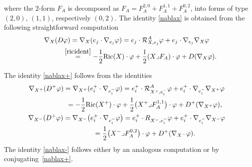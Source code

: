 \documentclass[pdftex]{sigma}
\numberwithin{equation}{section}
\theoremstyle{definition}
\begin{document}
where the $2$-form $F_A$ is decomposed as $F_A=F_A^{2,0}+F_A^{1,1}+F_A^{0,2}$, into forms of type $(2,0)$, $(1,1)$, respectively $(0,2)$.
The identity \eqref{nablax} is obtained from the following straightforward computation
\begin{gather*}
\nabla_X(D\varphi) =\nabla_X( e_j\cdot \nabla_{e_j}\varphi)= e_j\cdot \mathcal{R}^A_{X,e_j}\varphi+ e_j\cdot \nabla_{e_j}\nabla_X\varphi\\
 \hphantom{\nabla_X(D\varphi)}{} \overset{\eqref{ricident}}{=}-\frac{1}{2}{\mathop{\rm Ric}}(X)\cdot\varphi+\frac{1}{2}(X\lrcorner F_A)\cdot\varphi+D(\nabla_X \varphi).
\end{gather*}

The identity \eqref{nablax+} follows from the identities
\begin{gather*}
\nabla_{X^+}(D^+\varphi) =\nabla_{X^+}( e_i^+\cdot \nabla_{e_i^-}\varphi)= e_i^+\cdot \mathcal{R}^A_{X^+,e_i^-}\varphi+ e_i^+\cdot \nabla_{e_i^-}\nabla_{X^+}\varphi\\
\hphantom{\nabla_{X^+}(D^+\varphi)}{}
=-\frac{1}{2}\mathrm{Ric}(X^+)\cdot\varphi+\frac{1}{2}\big(X^+\lrcorner F^{1,1}_A\big)\cdot\varphi+D^+(\nabla_{X^+} \varphi),
\\
\nabla_{X^-}(D^+\varphi) =\nabla_{X^-}\big( e_i^+\cdot \nabla_{e_i^-}\varphi\big)= e_i^+\cdot R_{X^-,e_i^-}\varphi+ e_i^+\cdot \nabla_{e_i^-}\nabla_{X^-}\varphi\\
\hphantom{\nabla_{X^-}(D^+\varphi)}{}
=\frac{1}{2}\big(X^-\lrcorner F^{0,2}_A\big)\cdot\varphi+D^+(\nabla_{X^-} \varphi).
\end{gather*}
The identity \eqref{nablax-} follows either by an analogous computation or by  conjugating~\eqref{nablax+}.
\end{document}
